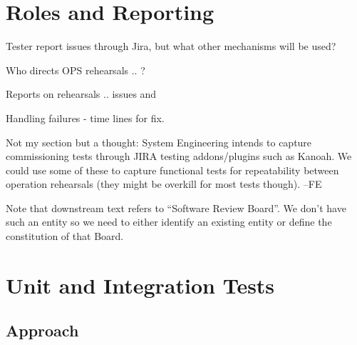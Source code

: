 




\section{Roles and Reporting}

Tester report issues through Jira, but what other mechanisms will be used?

Who directs OPS rehearsals .. ?

Reports on rehearsals .. issues and

Handling failures - time lines for fix.


\begin{note}
  Not my section but a thought: System Engineering intends to capture commissioning tests through JIRA testing addons/plugins such as Kanoah. We could use some of these to capture functional tests for repeatability between operation rehearsals (they might be overkill for most tests though). --FE
\end{note}

\begin{note}
  Note that downstream text refers to ``Software Review Board''. We don't have such an entity so we need to either identify an existing entity or define the constitution of that Board.
\end{note}















\section{Unit and Integration Tests}

\subsection{Approach}

